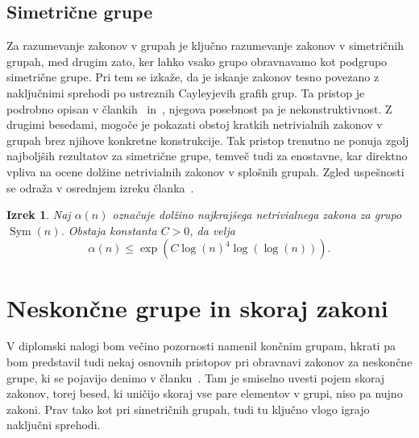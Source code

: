 \documentclass[12pt,a4paper]{article}
\newcounter{theoremcounter}[section] %
\newtheorem{izrek}[theoremcounter]{Izrek}
\begin{document}
\subsection{Simetrične grupe}
Za razumevanje zakonov v grupah je ključno razumevanje zakonov v simetričnih grupah, med drugim zato, ker lahko vsako grupo obravnavamo kot podgrupo simetrične grupe. Pri tem se izkaže, da je iskanje zakonov tesno povezano z naključnimi sprehodi po ustreznih Cayleyjevih grafih grup.
Ta pristop je podrobno opisan v člankih~\cite{Amir_Blachar_Gerasimova_Kozma_2023} in~\cite{Kozma_Thom_2016}, njegova posebnost pa je nekonstruktivnost. Z drugimi besedami, mogoče je pokazati
obstoj kratkih netrivialnih zakonov v grupah brez njihove konkretne konstrukcije. Tak pristop trenutno ne ponuja zgolj najboljših rezultatov za simetrične grupe, temveč tudi za enostavne, kar direktno vpliva
na ocene dolžine netrivialnih zakonov v splošnih grupah. Zgled uspešnosti se odraža v osrednjem izreku članka~\cite{Kozma_Thom_2016}.
\begin{izrek}
Naj $\alpha(n)$ označuje dolžino najkrajšega netrivialnega zakona za grupo $\operatorname{Sym}(n)$. Obstaja konstanta $C > 0$, da velja \begin{equation*}
\alpha(n) \le  \exp \left( C \log(n)^{4} \log(\log(n)) \right).
\end{equation*}  
\end{izrek}


\section{Neskončne grupe in skoraj zakoni}
V diplomski nalogi bom večino pozornosti namenil končnim grupam, hkrati pa bom predstavil tudi nekaj osnovnih pristopov pri obravnavi zakonov za neskončne grupe, ki se pojavijo denimo v članku~\cite{Amir_Blachar_Gerasimova_Kozma_2023}.  
Tam je smiselno uvesti pojem skoraj zakonov, torej besed, ki uničijo skoraj vse pare elementov v grupi, niso pa nujno zakoni. Prav tako kot pri simetričnih grupah, tudi tu ključno vlogo igrajo naključni sprehodi.  



\end{document}
